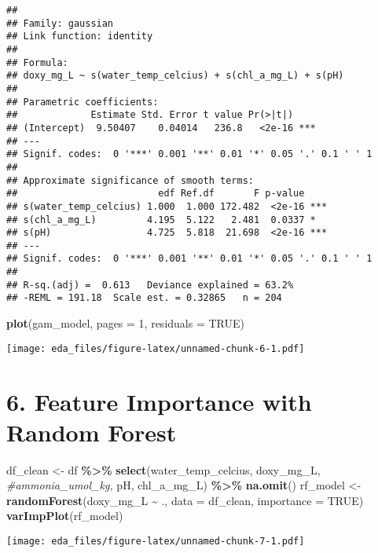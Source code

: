 \documentclass[
]{article}
\newenvironment{Shaded}{\begin{snugshade}}{\end{snugshade}}
\newcommand{\AttributeTok}[1]{\textcolor[rgb]{0.13,0.29,0.53}{#1}}
\newcommand{\CommentTok}[1]{\textcolor[rgb]{0.56,0.35,0.01}{\textit{#1}}}
\newcommand{\ConstantTok}[1]{\textcolor[rgb]{0.56,0.35,0.01}{#1}}
\newcommand{\DecValTok}[1]{\textcolor[rgb]{0.00,0.00,0.81}{#1}}
\newcommand{\FunctionTok}[1]{\textcolor[rgb]{0.13,0.29,0.53}{\textbf{#1}}}
\newcommand{\NormalTok}[1]{#1}
\newcommand{\OtherTok}[1]{\textcolor[rgb]{0.56,0.35,0.01}{#1}}
\newcommand{\SpecialCharTok}[1]{\textcolor[rgb]{0.81,0.36,0.00}{\textbf{#1}}}
\begin{document}
\begin{verbatim}
## 
## Family: gaussian 
## Link function: identity 
## 
## Formula:
## doxy_mg_L ~ s(water_temp_celcius) + s(chl_a_mg_L) + s(pH)
## 
## Parametric coefficients:
##             Estimate Std. Error t value Pr(>|t|)    
## (Intercept)  9.50407    0.04014   236.8   <2e-16 ***
## ---
## Signif. codes:  0 '***' 0.001 '**' 0.01 '*' 0.05 '.' 0.1 ' ' 1
## 
## Approximate significance of smooth terms:
##                         edf Ref.df       F p-value    
## s(water_temp_celcius) 1.000  1.000 172.482  <2e-16 ***
## s(chl_a_mg_L)         4.195  5.122   2.481  0.0337 *  
## s(pH)                 4.725  5.818  21.698  <2e-16 ***
## ---
## Signif. codes:  0 '***' 0.001 '**' 0.01 '*' 0.05 '.' 0.1 ' ' 1
## 
## R-sq.(adj) =  0.613   Deviance explained = 63.2%
## -REML = 191.18  Scale est. = 0.32865   n = 204
\end{verbatim}

\begin{Shaded}
\begin{Highlighting}[]
\FunctionTok{plot}\NormalTok{(gam\_model, }\AttributeTok{pages =} \DecValTok{1}\NormalTok{, }\AttributeTok{residuals =} \ConstantTok{TRUE}\NormalTok{)}
\end{Highlighting}
\end{Shaded}

\texttt{[image: eda\_files/figure-latex/unnamed-chunk-6-1.pdf]}

\hypertarget{feature-importance-with-random-forest}{%
\section{\texorpdfstring{\textbf{6. Feature Importance with Random
Forest}}{6. Feature Importance with Random Forest}}\label{feature-importance-with-random-forest}}

\begin{Shaded}
\begin{Highlighting}[]
\NormalTok{df\_clean }\OtherTok{\textless{}{-}}\NormalTok{ df }\SpecialCharTok{\%\textgreater{}\%} \FunctionTok{select}\NormalTok{(water\_temp\_celcius, doxy\_mg\_L, }\CommentTok{\#ammonia\_umol\_kg, }
\NormalTok{                          pH, chl\_a\_mg\_L) }\SpecialCharTok{\%\textgreater{}\%} \FunctionTok{na.omit}\NormalTok{()}
\NormalTok{rf\_model }\OtherTok{\textless{}{-}} \FunctionTok{randomForest}\NormalTok{(doxy\_mg\_L }\SpecialCharTok{\textasciitilde{}}\NormalTok{ ., }\AttributeTok{data =}\NormalTok{ df\_clean, }\AttributeTok{importance =} \ConstantTok{TRUE}\NormalTok{)}
\FunctionTok{varImpPlot}\NormalTok{(rf\_model)}
\end{Highlighting}
\end{Shaded}

\texttt{[image: eda\_files/figure-latex/unnamed-chunk-7-1.pdf]}
\end{document}
